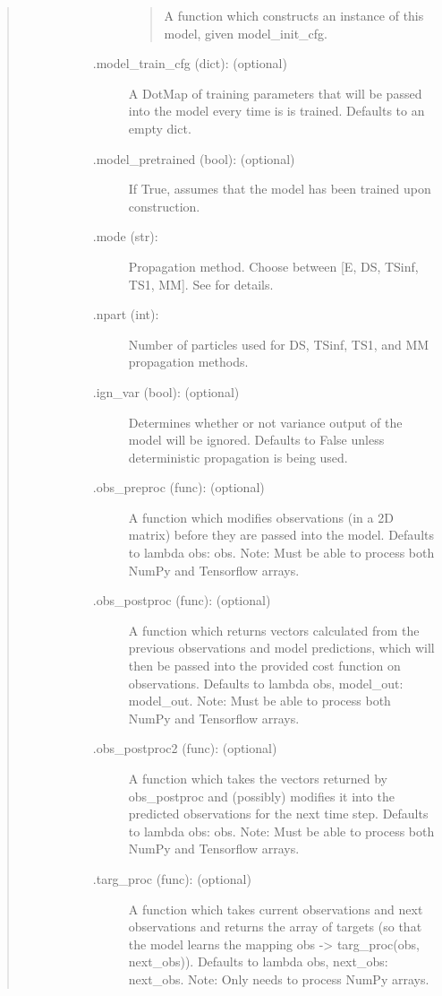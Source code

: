 \documentclass[letterpaper,10pt,english,openany,oneside]{sphinxmanual}
\begin{document}
\begin{fulllineitems}
\begin{quote}
\begin{description}
\begin{description}
\begin{description}
\begin{quote}
A function which constructs an instance of this model, given model\_init\_cfg.
\end{quote}

\item[{.model\_train\_cfg (dict): (optional)}] \leavevmode
A DotMap of training parameters that will be passed into the
model every time is is trained. Defaults to an empty dict.

\item[{.model\_pretrained (bool): (optional)}] \leavevmode
If True, assumes that the model has been trained upon construction.

\item[{.mode (str):}] \leavevmode
Propagation method. Choose between {[}E, DS, TSinf, TS1, MM{]}.
See  for details.

\item[{.npart (int):}] \leavevmode
Number of particles used for DS, TSinf, TS1, and MM propagation methods.

\item[{.ign\_var (bool): (optional)}] \leavevmode
Determines whether or not variance output of the model will be ignored.
Defaults to False unless deterministic propagation is being used.

\item[{.obs\_preproc (func): (optional)}] \leavevmode
A function which modifies observations (in a 2D matrix) before
they are passed into the model. Defaults to lambda obs: obs.
Note: Must be able to process both NumPy and Tensorflow arrays.

\item[{.obs\_postproc (func): (optional)}] \leavevmode
A function which returns vectors calculated from the previous
observations and model predictions, which will then be passed
into the provided cost function on observations. Defaults to
lambda obs, model\_out: model\_out. Note: Must be able to process
both NumPy and Tensorflow arrays.

\item[{.obs\_postproc2 (func): (optional)}] \leavevmode
A function which takes the vectors returned by obs\_postproc and (possibly)
modifies it into the predicted observations for the next time step.
Defaults to lambda obs: obs. Note: Must be able to process both NumPy and Tensorflow arrays.

\item[{.targ\_proc (func): (optional)}] \leavevmode
A function which takes current observations and next observations
and returns the array of targets (so that the model learns the mapping
obs -\textgreater{} targ\_proc(obs, next\_obs)). Defaults to lambda obs, next\_obs: next\_obs.
Note: Only needs to process NumPy arrays.


\end{description}
\end{description}
\end{description}
\end{quote}
\end{fulllineitems}
\end{document}
